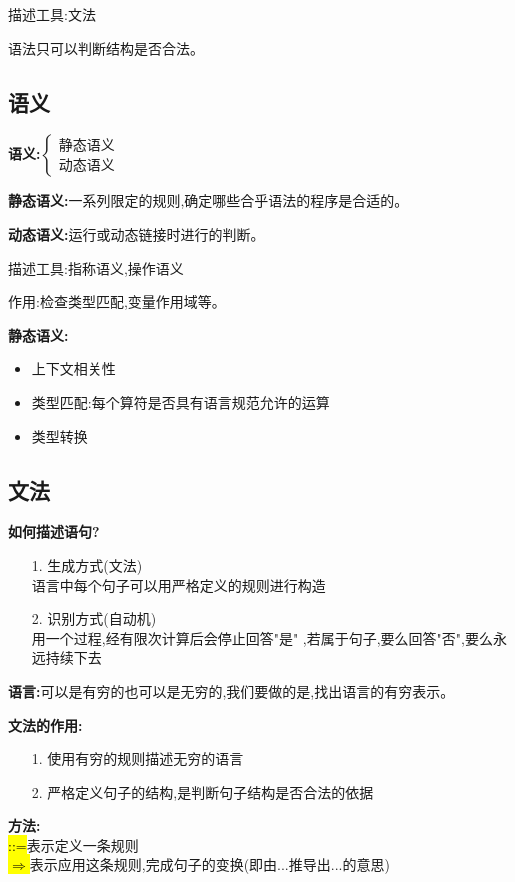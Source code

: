 描述工具:文法

语法只可以判断结构是否合法。

\subsection{语义}
\textbf{语义:}$\left \{ \begin{array}{l}\text{静态语义}\\\text{动态语义} \end{array} \right.$

\spaceline

\textbf{静态语义:}一系列限定的规则,确定哪些合乎语法的程序是合适的。

\textbf{动态语义:}运行或动态链接时进行的判断。

描述工具:指称语义,操作语义

作用:检查类型匹配,变量作用域等。

\textbf{静态语义:}
\begin{itemize}
 \item 上下文相关性
 \item 类型匹配:每个算符是否具有语言规范允许的运算
 \item 类型转换
\end{itemize}

\subsection{文法}
\textbf{如何描述语句?}
\begin{itemize}
 \item [1.] 生成方式(文法)\\
       语言中每个句子可以用严格定义的规则进行构造
 \item [2.] 识别方式(自动机)\\
       用一个过程,经有限次计算后会停止回答"是" ,若属于句子,要么回答"否",要么永远持续下去
\end{itemize}

\spaceline
\textbf{语言:}可以是有穷的也可以是无穷的,我们要做的是,找出语言的有穷表示。

\textbf{文法的作用:}
\begin{itemize}
 \item [1.] 使用有穷的规则描述无穷的语言
 \item [2.] 严格定义句子的结构,是判断句子结构是否合法的依据
\end{itemize}

\textbf{方法:}\\
\hl{::=}表示定义一条规则\\
\hl{$\Rightarrow$}表示应用这条规则,完成句子的变换(即由...推导出...的意思)

